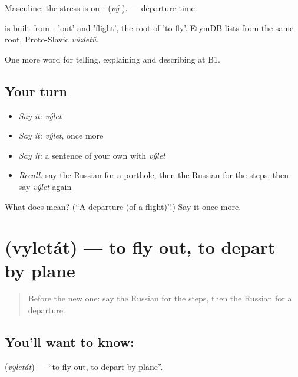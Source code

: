 Masculine; the stress is on \emph{-} (\emph{vý-}). \emph{ } — departure time.

\begin{cousinweb}
\emph{} is built from \emph{-} 'out' and \emph{} 'flight', the root of \emph{} 'to fly'. EtymDB lists \emph{} from the same root, Proto-Slavic \emph{vŭzletŭ}.
\end{cousinweb}

\begin{grammarlens}[title={What you've built}]
One more word for telling, explaining and describing at B1.
\end{grammarlens}

\subsection*{Your turn}
\begin{itemize}
\raggedright
  \item \emph{Say it:} \emph{výlet}
  \item \emph{Say it:} \emph{výlet}, once more
  \item \emph{Say it:} a sentence of your own with \emph{výlet}
  \item \emph{Recall:} say the Russian for a porthole, then the Russian for the steps, then say \emph{výlet} again
\end{itemize}

\begin{tcolorbox}[breakable,colback=teal!4,colframe=teal!35!black,title={Before you move on}]
What does  mean? (\textquotedblleft{}A departure (of a flight)\textquotedblright{}.) Say it once more.
\end{tcolorbox}
\section[\texorpdfstring{\ru{вылетать} (vyletát)}{вылетать (vyletát)}]{ (vyletát) — to fly out, to depart by plane}

\label{lesson:RU-C422-vyletat}



\begin{quote}
Before the new one: say the Russian for the steps, then the Russian for a departure.
\end{quote}

\subsection*{You'll want to know: }
\textbf{} (\emph{vyletát}) — \textquotedblleft{}to fly out, to depart by plane\textquotedblright{}.

